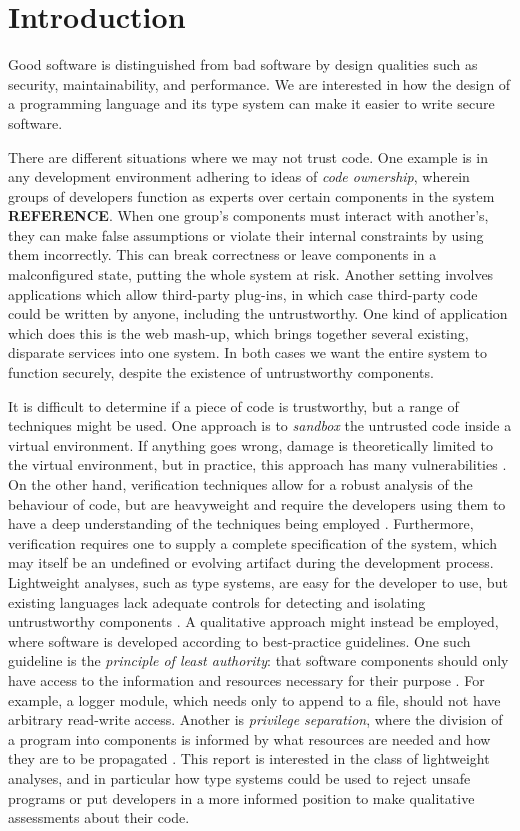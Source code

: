 \chapter{Introduction}\label{C:intro}

Good software is distinguished from bad software by design qualities such as security, maintainability, and performance. We are interested in how the design of a programming language and its type system can make it easier to write secure software.

There are different situations where we may not trust code. One example is in any development environment adhering to ideas of \textit{code ownership}, wherein groups of developers function as experts over certain components in the system \textbf{REFERENCE}. When one group's components must interact with another's, they can make false assumptions or violate their internal constraints by using them incorrectly. This can break correctness or leave components in a malconfigured state, putting the whole system at risk.  Another setting involves applications which allow third-party plug-ins, in which case third-party code could be written by anyone, including the untrustworthy. One kind of application which does this is the web mash-up, which brings together several existing, disparate services into one system. In both cases we want the entire system to function securely, despite the existence of untrustworthy components.

It is difficult to determine if a piece of code is trustworthy, but a range of techniques might be used. One approach is to \textit{sandbox} the untrusted code inside a virtual environment. If anything goes wrong, damage is theoretically limited to the virtual environment, but in practice, this approach has many vulnerabilities \cite{coker15, maass16, watson07, schreuders13}. On the other hand, verification techniques allow for a robust analysis of the behaviour of code, but are heavyweight and require the developers using them to have a deep understanding of the techniques being employed \cite{kneuper97}. Furthermore, verification requires one to supply a complete specification of the system, which may itself be an undefined or evolving artifact during the development process. Lightweight analyses, such as type systems, are easy for the developer to use, but existing languages lack adequate controls for detecting and isolating untrustworthy components \cite{chen07, ter-louw08}. A qualitative approach might instead be employed, where software is developed according to best-practice guidelines. One such guideline is the \textit{principle of least authority}: that software components should only have access to the information and resources necessary for their purpose \cite{saltzer74}. For example, a logger module, which needs only to append to a file, should not have arbitrary read-write access. Another is \textit{privilege separation}, where the division of a program into components is informed by what resources are needed and how they are to be propagated \cite{saltzer75}. This report is interested in the class of lightweight analyses, and in particular how type systems could be used to reject unsafe programs or put developers in a more informed position to make qualitative assessments about their code.

